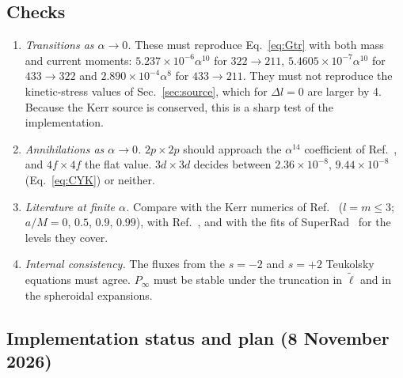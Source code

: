 \documentclass[11pt]{article}
\begin{document}
\subsection{Checks}

\begin{enumerate}
\item \emph{Transitions as $\alpha\to0$.} These must reproduce Eq.~\eqref{eq:Gtr} with both mass and current moments: $5.237\times10^{-6}\alpha^{10}$ for $322\to211$, $5.4605\times10^{-7}\alpha^{10}$ for $433\to322$ and $2.890\times10^{-4}\alpha^8$ for $433\to211$. They must not reproduce the kinetic-stress values of Sec.~\ref{sec:source}, which for $\Delta l=0$ are larger by 4. Because the Kerr source is conserved, this is a sharp test of the implementation.
\item \emph{Annihilations as $\alpha\to0$.} $2p\times2p$ should approach the $\alpha^{14}$ coefficient of Ref.~\cite{Brito17}, and $4f\times4f$ the flat value. $3d\times3d$ decides between $2.36\times10^{-8}$, $9.44\times10^{-8}$ (Eq.~\eqref{eq:CYK}) or neither.
\item \emph{Literature at finite $\alpha$.} Compare with the Kerr numerics of Ref.~\cite{YK14} ($l=m\le3$; $a/M=0$, $0.5$, $0.9$, $0.99$), with Ref.~\cite{Brito17}, and with the fits of SuperRad~\cite{SME23} for the levels they cover.
\item \emph{Internal consistency.} The fluxes from the $s=-2$ and $s=+2$ Teukolsky equations must agree. $P_\infty$ must be stable under the truncation in $\tilde\ell$ and in the spheroidal expansions.
\end{enumerate}

\subsection{Implementation status and plan (8 November 2026)}
\label{sec:kerr-status}
\end{document}
